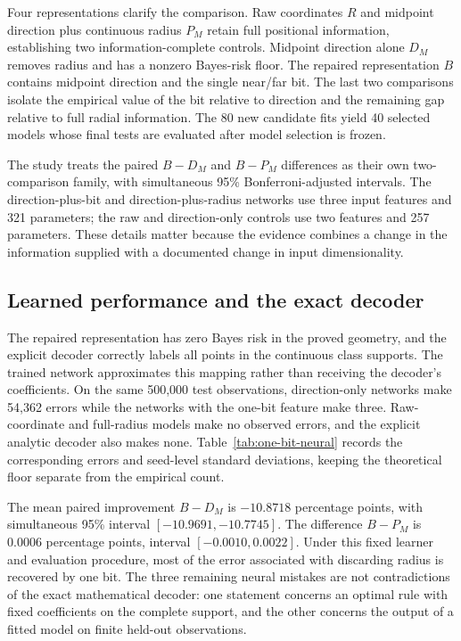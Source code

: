\documentclass[12pt,a4paper]{article}
\begin{document}
Four representations clarify the comparison. Raw coordinates \(R\) and midpoint direction plus continuous radius \(P_M\) retain full positional information, establishing two information-complete controls. Midpoint direction alone \(D_M\) removes radius and has a nonzero Bayes-risk floor. The repaired representation \(B\) contains midpoint direction and the single near/far bit. The last two comparisons isolate the empirical value of the bit relative to direction and the remaining gap relative to full radial information. The 80 new candidate fits yield 40 selected models whose final tests are evaluated after model selection is frozen.

The study treats the paired \(B-D_M\) and \(B-P_M\) differences as their own two-comparison family, with simultaneous 95\% Bonferroni-adjusted intervals. The direction-plus-bit and direction-plus-radius networks use three input features and 321 parameters; the raw and direction-only controls use two features and 257 parameters. These details matter because the evidence combines a change in the information supplied with a documented change in input dimensionality.

\subsection{Learned performance and the exact decoder}
The repaired representation has zero Bayes risk in the proved geometry, and the explicit decoder correctly labels all points in the continuous class supports. The trained network approximates this mapping rather than receiving the decoder's coefficients. On the same 500,000 test observations, direction-only networks make 54,362 errors while the networks with the one-bit feature make three. Raw-coordinate and full-radius models make no observed errors, and the explicit analytic decoder also makes none. Table~\ref{tab:one-bit-neural} records the corresponding errors and seed-level standard deviations, keeping the theoretical floor separate from the empirical count.

The mean paired improvement \(B-D_M\) is \(-10.8718\) percentage points, with simultaneous 95\% interval \([-10.9691,-10.7745]\). The difference \(B-P_M\) is \(0.0006\) percentage points, interval \([-0.0010,0.0022]\). Under this fixed learner and evaluation procedure, most of the error associated with discarding radius is recovered by one bit. The three remaining neural mistakes are not contradictions of the exact mathematical decoder: one statement concerns an optimal rule with fixed coefficients on the complete support, and the other concerns the output of a fitted model on finite held-out observations.
\end{document}

